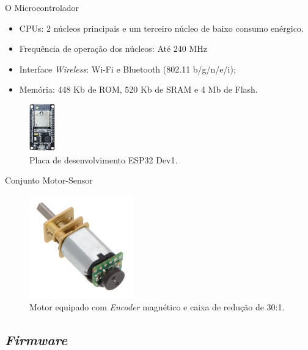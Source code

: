 \begin{frame}{O Microcontrolador}

\begin{itemize}
    \item CPUs: 2 núcleos principais e um terceiro núcleo de baixo consumo enérgico. 
    \item Frequência de operação dos núcleos: Até $240$ MHz
    \item Interface \emph{Wireless}: Wi-Fi e Bluetooth (802.11 b/g/n/e/i);
    \item Memória: 448 Kb de ROM, 520 Kb de SRAM e 4 Mb de Flash.
\end{itemize}

\begin{figure}[H]
    \centering
    \includegraphics[width=0.1\textwidth]{figuras/eletronica/esp32_kit.png}
    \caption{Placa de desenvolvimento ESP32 Dev1.}
\end{figure}

\end{frame}

\begin{frame}{Conjunto Motor-Sensor}
    \begin{figure}
        \centering
        \includegraphics[width=0.4\textwidth]{figuras/eletronica/motor_com_encoder.jpg}
        \caption{Motor equipado com \emph{Encoder} magnético e caixa de redução de 30:1.}
    \end{figure}
\end{frame}

\subsection{\emph{Firmware}}

